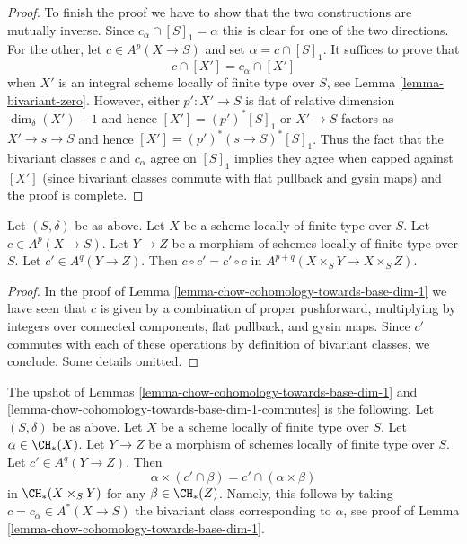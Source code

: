 \begin{proof}
\medskip\noindent
To finish the proof we have to show that the two constructions
are mutually inverse. Since $c_\alpha \cap [S]_1 = \alpha$
this is clear for one of the two directions. For the other, let
$c \in A^p(X \to S)$ and set $\alpha = c \cap [S]_1$.
It suffices to prove that
$$
c \cap [X'] = c_\alpha \cap [X']
$$
when $X'$ is an integral scheme locally of finite type over $S$,
see Lemma \ref{lemma-bivariant-zero}. However, either $p' : X' \to S$
is flat of relative dimension $\dim_\delta(X') - 1$ and hence
$[X'] = (p')^*[S]_1$ or $X' \to S$ factors as $X' \to s \to S$
and hence $[X'] = (p')^*(s \to S)^*[S]_1$. Thus the fact that the
bivariant classes $c$ and $c_\alpha$ agree on $[S]_1$
implies they agree when capped against $[X']$ (since bivariant classes
commute with flat pullback and gysin maps) and the proof is complete.
\end{proof}

\begin{lemma}
\label{lemma-chow-cohomology-towards-base-dim-1-commutes}
Let $(S, \delta)$ be as above. Let $X$ be a scheme locally of finite type
over $S$. Let $c \in A^p(X \to S)$. Let $Y \to Z$ be a morphism of schemes
locally of finite type over $S$. Let $c' \in A^q(Y \to Z)$. Then
$c \circ c' = c' \circ c$ in $A^{p + q}(X \times_S Y \to X \times_S Z)$.
\end{lemma}

\begin{proof}
In the proof of Lemma \ref{lemma-chow-cohomology-towards-base-dim-1}
we have seen that $c$ is given by a combination of
proper pushforward, multiplying by integers over connected
components, flat pullback, and gysin maps. Since $c'$ commutes with each of
these operations by definition of bivariant classes, we conclude.
Some details omitted.
\end{proof}

\begin{remark}
\label{remark-commuting-exterior-dim-1}
The upshot of Lemmas \ref{lemma-chow-cohomology-towards-base-dim-1}
and \ref{lemma-chow-cohomology-towards-base-dim-1-commutes} is the following.
Let $(S, \delta)$ be as above. Let $X$ be a scheme locally of finite type
over $S$.
Let $\alpha \in \CH_*(X)$. Let $Y \to Z$ be a morphism of schemes
locally of finite type over $S$. Let $c' \in A^q(Y \to Z)$. Then
$$
\alpha \times (c' \cap \beta) = c' \cap (\alpha \times \beta)
$$
in $\CH_*(X \times_S Y)$ for any $\beta \in \CH_*(Z)$. Namely, this
follows by taking $c = c_\alpha \in A^*(X \to S)$ the bivariant class
corresponding to $\alpha$, see proof of
Lemma \ref{lemma-chow-cohomology-towards-base-dim-1}.
\end{remark}

